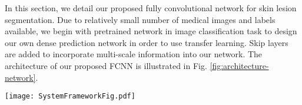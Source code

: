 \documentclass{article}
\begin{document}
In this section, we detail our proposed fully convolutional network for skin lesion segmentation. Due to relatively small number of medical images and labels available, we begin with pretrained network in image classification task to design our own dense prediction network in order to use transfer learning. Skip layers are added to incorporate multi-scale information into our network.    
The architecture of our proposed FCNN is illustrated in Fig. \ref{fig:architecture-network}.
\begin{figure*}[htb]

\begin{minipage}[b]{1.0\linewidth}
  \centering
  \centerline{\texttt{[image: SystemFrameworkFig.pdf]}}
\end{minipage}
%
%
\caption{Architecture of our proposed FCNN. Blue vertical bar with solid contour: convolution layer; red vertical bar with dash contour: pooling layer; Blue small square: $1\times 1$ convolution layer; Blue horizontal bar: deconvolution layer for upsampling; Blue rectangular cube: fusing layer with concatenation operation.  Our FCNN learns to use multi-scale information.}
\label{fig:architecture-network}
%
\end{figure*}
\end{document}

